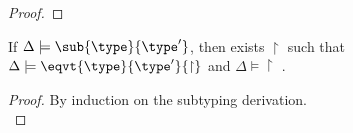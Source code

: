 \begin{proof}


    
\end{proof}

\begin{thm}
 If $\Delta \models \sub{\type}{\type'}$, then exists $\restriction$ such that $\Delta \models \eqvt{\type}{\type'}{\restriction}$ and  $\Delta \models \restriction $ .
\end{thm}
\begin{proof}
By induction on the subtyping derivation.\\
 
    
\end{proof}